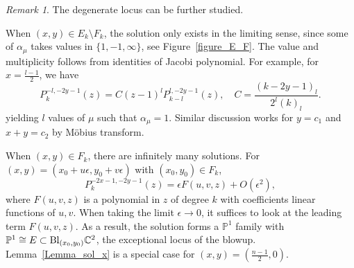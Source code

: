 \documentclass[11pt]{amsart}
\theoremstyle{remark}
\newtheorem{remark}[theorem]{Remark}
\numberwithin{equation}{section}
\begin{document}
\begin{remark} \label{Rmk_dege_loci}
The degenerate locus can be further studied. 

When $(x,y) \in E_k \setminus F_k$, the solution only exists in the limiting sense, since some of $\alpha_\mu$ takes values in $\{1,-1,\infty\}$, see Figure~\ref{figure_E_F}. The value and multiplicity follows from identities of Jacobi polynomial. For example, for $x = \frac{l-1}{2}$, we have
\[
    P_k^{-l, -2y-1} (z) = C (z-1)^l P_{k-l}^{l, -2y-1}(z), \quad C = \frac{(k-2y-1)_l}{2^l (k)_l}.
\]
yielding $l$ values of $\mu$ such that $\alpha_\mu = 1$. Similar discussion works for $y=c_1$ and $x+y=c_2$ by M\"obius transform.

When $(x,y) \in F_k$, there are infinitely many solutions. For $(x,y) = (x_0+u\epsilon, y_0+v\epsilon)$ with $(x_0,y_0) \in F_k$, 
\[
    P_k^{-2x-1,-2y-1}(z) = \epsilon F(u,v,z) + O(\epsilon^2),
\]
where $F(u,v,z)$ is a polynomial in $z$ of degree $k$ with coefficients linear functions of $u,v$. When taking the limit $\epsilon\rightarrow 0$, it suffices to look at the leading term $F(u,v,z)$. As a result, the solution forms a $\mathbb{P}^1$ family with $\mathbb{P}^1 \cong E \subset {\rm Bl}_{(x_0,y_0)} \mathbb{C}^2 $, the exceptional locus of the blowup. Lemma~\ref{Lemma_sol_x} is a special case for $(x,y) = ( \frac{n-1}{2},0 )$. 
\end{remark}
\vspace{3mm}
\end{document}
